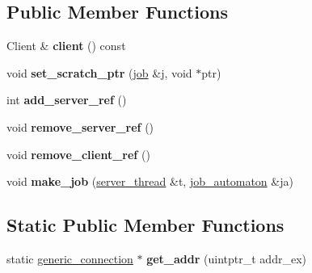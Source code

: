 \subsection*{Public Member Functions}
\begin{DoxyCompactItemize}
\item 
\hypertarget{classrml_1_1internal_1_1generic__connection_a1f07daadf70347f3c2b56550a77e4d3b}{}Client \& {\bfseries client} () const \label{classrml_1_1internal_1_1generic__connection_a1f07daadf70347f3c2b56550a77e4d3b}

\item 
\hypertarget{classrml_1_1internal_1_1generic__connection_a3b1710b57d52d1185230055fff8be2c4}{}void {\bfseries set\+\_\+scratch\+\_\+ptr} (\hyperlink{classrml_1_1job}{job} \&j, void $\ast$ptr)\label{classrml_1_1internal_1_1generic__connection_a3b1710b57d52d1185230055fff8be2c4}

\item 
\hypertarget{classrml_1_1internal_1_1generic__connection_aaca621bb581e764e70fbc49efc92979b}{}int {\bfseries add\+\_\+server\+\_\+ref} ()\label{classrml_1_1internal_1_1generic__connection_aaca621bb581e764e70fbc49efc92979b}

\item 
\hypertarget{classrml_1_1internal_1_1generic__connection_a76b0f2fc2ebe8e5971b2c787e83e47fc}{}void {\bfseries remove\+\_\+server\+\_\+ref} ()\label{classrml_1_1internal_1_1generic__connection_a76b0f2fc2ebe8e5971b2c787e83e47fc}

\item 
\hypertarget{classrml_1_1internal_1_1generic__connection_aab2924c65627cf1bc16f87e1859789c8}{}void {\bfseries remove\+\_\+client\+\_\+ref} ()\label{classrml_1_1internal_1_1generic__connection_aab2924c65627cf1bc16f87e1859789c8}

\item 
\hypertarget{classrml_1_1internal_1_1generic__connection_a4317e6947843da06e4a2041876c8431a}{}void {\bfseries make\+\_\+job} (\hyperlink{classrml_1_1internal_1_1server__thread}{server\+\_\+thread} \&t, \hyperlink{classrml_1_1internal_1_1job__automaton}{job\+\_\+automaton} \&ja)\label{classrml_1_1internal_1_1generic__connection_a4317e6947843da06e4a2041876c8431a}

\end{DoxyCompactItemize}
\subsection*{Static Public Member Functions}
\begin{DoxyCompactItemize}
\item 
\hypertarget{classrml_1_1internal_1_1generic__connection_ae1af80e30295d661eab1318e0cf850d9}{}static \hyperlink{classrml_1_1internal_1_1generic__connection}{generic\+\_\+connection} $\ast$ {\bfseries get\+\_\+addr} (uintptr\+\_\+t addr\+\_\+ex)\label{classrml_1_1internal_1_1generic__connection_ae1af80e30295d661eab1318e0cf850d9}

\end{DoxyCompactItemize}
